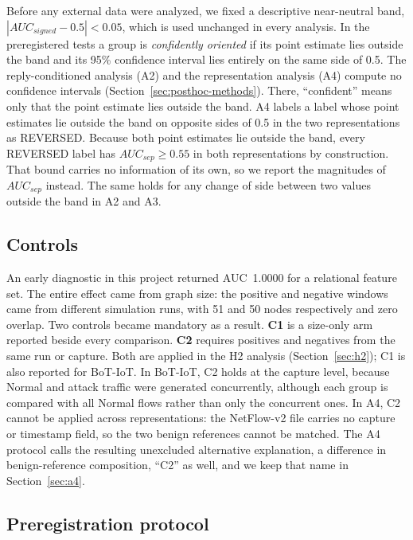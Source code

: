\documentclass[preprint,12pt]{elsarticle}
\begin{document}
Before any external data were analyzed, we fixed a descriptive near-neutral band, $|AUC_{signed}-0.5|<0.05$, which is used unchanged in every analysis. In the preregistered tests a group is \emph{confidently oriented} if its point estimate lies outside the band and its 95\% confidence interval lies entirely on the same side of 0.5. The reply-conditioned analysis (A2) and the representation analysis (A4) compute no confidence intervals (Section~\ref{sec:posthoc-methods}). There, ``confident'' means only that the point estimate lies outside the band. A4 labels a label whose point estimates lie outside the band on opposite sides of 0.5 in the two representations as REVERSED. Because both point estimates lie outside the band, every REVERSED label has $AUC_{sep}\ge 0.55$ in both representations by construction. That bound carries no information of its own, so we report the magnitudes of $AUC_{sep}$ instead. The same holds for any change of side between two values outside the band in A2 and A3.

\subsection{Controls}\label{sec:controls}

An early diagnostic in this project returned AUC~1.0000 for a relational feature set. The entire effect came from graph size: the positive and negative windows came from different simulation runs, with 51 and 50 nodes respectively and zero overlap. Two controls became mandatory as a result. \textbf{C1} is a size-only arm reported beside every comparison. \textbf{C2} requires positives and negatives from the same run or capture. Both are applied in the H2 analysis (Section~\ref{sec:h2}); C1 is also reported for BoT-IoT. In BoT-IoT, C2 holds at the capture level, because Normal and attack traffic were generated concurrently, although each group is compared with all Normal flows rather than only the concurrent ones. In A4, C2 cannot be applied across representations: the NetFlow-v2 file carries no capture or timestamp field, so the two benign references cannot be matched. The A4 protocol calls the resulting unexcluded alternative explanation, a difference in benign-reference composition, ``C2'' as well, and we keep that name in Section~\ref{sec:a4}.

\subsection{Preregistration protocol}\label{sec:protocol}
\end{document}
